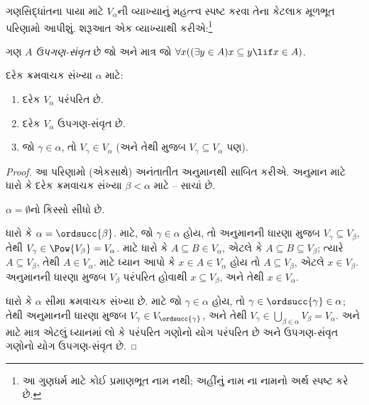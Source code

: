 \documentclass[../../../include/open-logic-section]{subfiles}
\begin{document}

ગણસિદ્ધાંતના પાયા માટે $V_\alpha$ની વ્યાખ્યાનું મહત્ત્વ
સ્પષ્ટ કરવા તેના કેટલાક મૂળભૂત પરિણામો આપીશું. શરૂઆત એક
વ્યાખ્યાથી કરીએ:\footnote{આ ગુણધર્મ માટે કોઈ પ્રમાણભૂત નામ નથી;
અહીંનું નામ \citet{ButtonLT1}ના નામનો અર્થ સ્પષ્ટ કરે છે.}
\begin{defn}
	ગણ $A$ \emph{ઉપગણ-સંવૃત} છે જો અને માત્ર જો
	$\forall x((\exists y \in A)x \subseteq y \lif x \in A)$.
\end{defn}
\begin{lem}
દરેક ક્રમવાચક સંખ્યા $\alpha$ માટે:
\begin{enumerate}
	\item{} દરેક $V_\alpha$ પરંપરિત છે.
	\item{} દરેક $V_\alpha$ ઉપગણ-સંવૃત છે.
	\item{} જો $\gamma \in \alpha$, તો $V_\gamma
	\in V_\alpha$ (અને તેથી  મુજબ
	$V_\gamma \subseteq V_\alpha$ પણ).
\end{enumerate}
\end{lem}

\begin{proof}
આ પરિણામો (એકસાથે) અનંતાતીત અનુમાનથી સાબિત કરીએ. અનુમાન માટે
ધારો કે દરેક ક્રમવાચક સંખ્યા $\beta < \alpha$ માટે
-- સાચાં છે.

$\alpha = \emptyset$નો કિસ્સો સીધો છે.

ધારો કે $\alpha = \ordsucc{\beta}$.  માટે,
જો $\gamma \in \alpha$ હોય, તો અનુમાનની ધારણા મુજબ
$V_\gamma \subseteq V_\beta$, તેથી
$V_\gamma \in \Pow{V_\beta} = V_\alpha$. 
માટે ધારો કે $A \subseteq B \in V_\alpha$, એટલે કે $A
\subseteq B \subseteq V_\beta$; ત્યારે $A \subseteq V_\beta$,
તેથી $A \in
V_\alpha$.  માટે ધ્યાન આપો કે $x \in A \in
V_\alpha$ હોય તો $A \subseteq V_\beta$, એટલે $x \in V_\beta$.
અનુમાનની ધારણા મુજબ $V_\beta$ પરંપરિત હોવાથી $x
\subseteq V_\beta$, અને તેથી $x
\in V_\alpha$.

ધારો કે $\alpha$ સીમા ક્રમવાચક સંખ્યા છે. 
માટે જો $\gamma \in \alpha$ હોય, તો
$\gamma \in \ordsucc{\gamma} \in \alpha$; તેથી અનુમાનની ધારણા
મુજબ $V_\gamma \in V_{\ordsucc{\gamma}}$, અને તેથી
$V_\gamma \in \bigcup_{\beta \in \alpha} V_\beta = V_\alpha$.
 અને  માટે માત્ર
એટલું ધ્યાનમાં લો કે પરંપરિત ગણોનો યોગ પરંપરિત છે અને
ઉપગણ-સંવૃત ગણોનો યોગ ઉપગણ-સંવૃત છે.
\end{proof}
\end{document}
